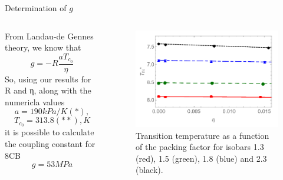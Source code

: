 \documentclass{beamer}
\begin{document}
\begin{frame}{Determination of $g$}
    \begin{columns}
        \begin{column}{0.5\textwidth}
        From Landau-de Gennes theory, we know that 
        $$g = -R\frac{aT_{c_0}}{\eta}$$
        So, using our results for R and η, along with the numericla values 
        $$a = 190 kPa/K (*),$$
        $$T_{c_0} = 313.8 (**),K$$
        it is possible to calculate the coupling constant for 8CB
        $$g = 53MPa$$
        \end{column}

        \begin{column}{0.5\textwidth}
        \begin{figure}
            \centering
            \includegraphics[scale = 0.30]{Figures/G_Det1.png}
            \caption{{\scriptsize Transition temperature as a function of the packing factor for isobars 1.3 (red), 1.5 (green), 1.8 (blue) and 2.3 (black).}}
            \label{fig:enter-label}
        \end{figure}
        \end{column}
    \end{columns}
\end{frame}
\end{document}
